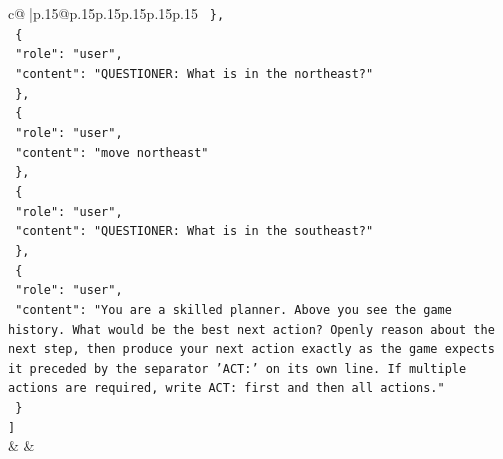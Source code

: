 \documentclass{article}
\begin{document}
{\begin{supertabular}{c@{$\;$}|p{.15\linewidth}@{}p{.15\linewidth}p{.15\linewidth}p{.15\linewidth}p{.15\linewidth}p{.15\linewidth}}
{{{\texttt{  \},} \\
\texttt{  \{} \\
\texttt{    "role": "user",} \\
\texttt{    "content": "QUESTIONER: What is in the northeast?"} \\
\texttt{  \},} \\
\texttt{  \{} \\
\texttt{    "role": "user",} \\
\texttt{    "content": "move northeast"} \\
\texttt{  \},} \\
\texttt{  \{} \\
\texttt{    "role": "user",} \\
\texttt{    "content": "QUESTIONER: What is in the southeast?"} \\
\texttt{  \},} \\
\texttt{  \{} \\
\texttt{    "role": "user",} \\
\texttt{    "content": "You are a skilled planner. Above you see the game history. What would be the best next action? Openly reason about the next step, then produce your next action exactly as the game expects it preceded by the separator 'ACT:' on its own line. If multiple actions are required, write ACT: first and then all actions."} \\
\texttt{  \}} \\
\texttt{{]}} \\
            }
        }
    }
    & & \\ \\


\end{supertabular}}
\end{document}
